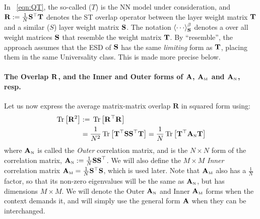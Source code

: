 In \EQN~\ref{eqn:QT}, the so-called \emph{\Teacher} ($T$) is the NN model under consideration,
and 
$\mathbf{R}:=\frac{1}{N}{{\mathbf{S}}^{\top}{\mathbf{T}}}$
denotes the ST overlap operator 
between the \Teacher layer weight matrix ${\mathbf{T}}$ and a similar \emph{\Student} ($S$) layer weight matrix ${\mathbf{S}}$.
The notation $\THRMAVGIZ{\cdots}$ denotes a \ThermalAverage over
all \Student weight matrices ${\mathbf{S}}$ that resemble the \Teacher weight matrix ${\mathbf{T}}$.
By ``resemble'', the \SETOL approach assumes that 
the ESD of ${\mathbf{S}}$ has the same \emph{limiting} form as ${\mathbf{T}}$, placing them in the same \HTSR Universality class.
This is made more precise below.

\paragraph{The Overlap $\mathbf{R}$, and the Inner and Outer forms of $\mathbf{A}$, ${\mathbf{A}}_{\text{\tiny M}}$ and ${\mathbf{A}}_{\text{\tiny N}}$, resp.}
Let us now express the average matrix-matrix overlap $\mathbf{R}$ in squared form using:
\begin{align}
  \label{eqn:R2}
\mbox{}\operatorname{Tr}\left[\mathbf{R}^{2}\right] &:=\mbox{}\operatorname{Tr}\left[\mathbf{R}^{\top}\mathbf{R}\right]  \\ \nonumber
&=\frac{1}{N^{2}}\mbox{}\operatorname{Tr}\left[{\mathbf{T}}^{\top}{\mathbf{S}}{\mathbf{S}}^{\top}{\mathbf{T}}\right]
=\frac{1}{N}\mbox{}\operatorname{Tr}\left[{\mathbf{T}}^{\top}{\mathbf{A}}_{\text{\tiny N}}{\mathbf{T}}\right]
\end{align}
where ${\mathbf{A}}_{\text{\tiny N}}$ is called the \emph{Outer} \Student correlation matrix, and is  the $N\times N$ form of the \Student correlation matrix,
${\mathbf{A}}_{\text{\tiny N}}:=\frac{1}{N}\mathbf{SS}^{\top}$.
We will also define the $M\times M$ \emph{Inner} \Student correlation matrix ${\mathbf{A}}_{\text{\tiny M}}=\frac{1}{N}{\mathbf{S}}^{\top}{\mathbf{S}}$, which is 
used later. Note that ${\mathbf{A}}_{\text{\tiny M}}$ also has a $\frac 1 N$ factor, so that its non-zero eigenvalues will be the same as ${\mathbf{A}}_{\text{\tiny N}}$, but has dimensions $M \times M$. We will denote the Outer ${\mathbf{A}}_{\text{\tiny N}}$ and Inner ${\mathbf{A}}_{\text{\tiny M}}$ forms when the context demands it, and will simply use the general form $\mathbf{A}$ when they can be interchanged.



